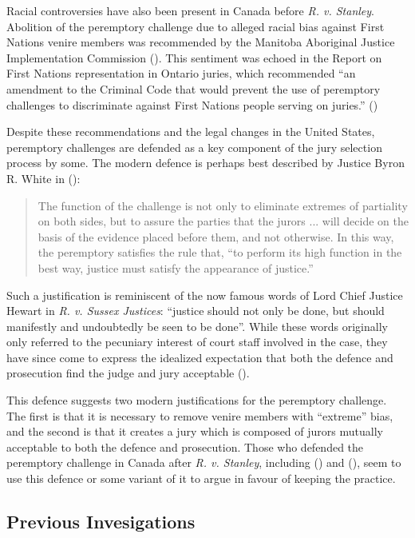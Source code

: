 Racial controversies have also been present in Canada before \textit{R. v. Stanley}. Abolition of the peremptory challenge due to alleged racial bias against First Nations
venire members was recommended by the Manitoba Aboriginal Justice Implementation Commission (\cite{MBajic}). This sentiment was echoed in the \citeauthor{iacobuccireport} Report on First Nations representation in
Ontario juries, which recommended ``an amendment to the Criminal Code that would
prevent the use of peremptory challenges to discriminate against First
Nations people serving on juries.'' (\cite{iacobuccireport})

Despite these recommendations and the legal changes in the United States, peremptory challenges are
defended as a key component of the jury selection process by some. The modern defence is perhaps best described by Justice Byron
R. White in (\cite{swainvalabama}):

\begin{quote}
The function of the challenge is not only to eliminate extremes of partiality on both sides, but to assure the parties that the
jurors ... will decide on the basis of the evidence placed before them, and not otherwise. In this way,
the peremptory satisfies the rule that, ``to perform its high function in the best way, justice must satisfy the appearance of
justice.''
\end{quote}

Such a justification is reminiscent of the now famous words of Lord Chief Justice Hewart in \textit{R. v. Sussex Justices}:
``justice should not only be done, but should manifestly and undoubtedly be seen to be done''. While these words originally only referred to the pecuniary interest of court staff involved in the case, they
have since come to express the idealized expectation that both the defence and prosecution find the judge and jury acceptable (\cite{oakes2016}).

This defence suggests two modern justifications for the peremptory challenge. The first is that it is necessary to remove venire members with
``extreme'' bias, and the second is that it creates a jury which is composed of jurors mutually acceptable to both the defence and prosecution. Those who defended the peremptory
challenge in Canada after \textit{R. v. Stanley}, including
(\cite{peremparegood}) and (\cite{macnabproper}), seem to use this defence or some variant of it to argue in favour of keeping the
practice.

\subsection{Previous Invesigations} \label{sec:prevwork}

